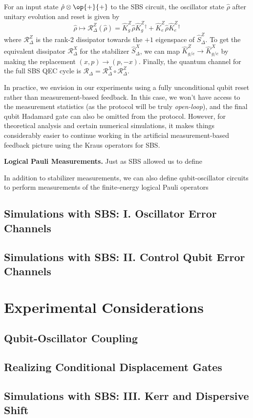 For an input state $\hat{\rho}\otimes \op{+}{+}$ to the SBS circuit, the oscillator state $\hat{\rho}$ after unitary evolution and reset is given by
\begin{equation}
    \hat{\rho} \mapsto \mathcal{R}_\Delta^Z(\hat{\rho}) = \hat{K}_g^Z \hat{\rho} \hat{K}_g^Z{}^\dagger + \hat{K}_e^Z \hat{\rho} \hat{K}_e^Z{}^\dagger  
\end{equation}
where $\mathcal{R}_\Delta^Z$ is the rank-2 dissipator towards the $+1$ eigenspace of $\hat{S}_\Delta^Z$. To get the equivalent dissipator $\mathcal{R}_\Delta^X$ for the stabilizer $\hat{S}_\Delta^X$, we can map $\hat{K}_{g/e}^Z \to \hat{K}_{g/e}^X$ by making the replacement $(x, p) \to (p, -x)$. Finally, the quantum channel for the full SBS QEC cycle is $\mathcal{R}_\Delta = \mathcal{R}_\Delta^X \circ \mathcal{R}_\Delta^Z$. 

In practice, we envision in our experiments using a fully unconditional qubit reset rather than measurement-based feedback. In this case, we won't have access to the measurement statistics (as the protocol will be truly \textit{open-loop}), and the final qubit Hadamard gate can also be omitted from the protocol. However, for theoretical analysis and certain numerical simulations, it makes things considerably easier to continue working in the artificial measurement-based feedback picture using the Kraus operators for SBS.

\noindent\textbf{Logical Pauli Measurements.} Just as SBS allowed us to define 

In addition to stabilizer measurements, we can also define qubit-oscillator circuits to perform measurements of the finite-energy logical Pauli operators 




\subsection{Simulations with SBS: I. Oscillator Error Channels}

\subsection{Simulations with SBS: II. Control Qubit Error Channels}













\section{Experimental Considerations}

\subsection{Qubit-Oscillator Coupling}

\subsection{Realizing Conditional Displacement Gates}

\subsection{Simulations with SBS: III. Kerr and Dispersive Shift}

